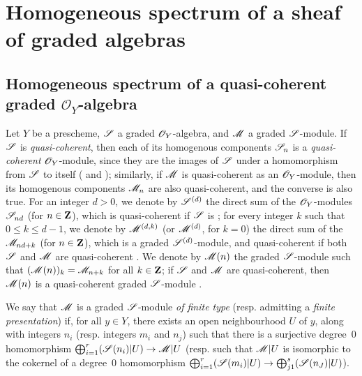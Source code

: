 \section{Homogeneous spectrum of a sheaf of graded algebras}
\label{section:II.3}


\subsection{Homogeneous spectrum of a quasi-coherent graded $\mathcal{O}_Y$-algebra}
\label{subsection:II.3.1}

\begin{env}[3.1.1]
\label{II.3.1.1}
Let $Y$ be a prescheme, $\mathscr{S}$ a graded $\mathscr{O}_Y$-algebra, and $\mathscr{M}$ a graded $\mathscr{S}$-module.
If $\mathscr{S}$ is \emph{quasi-coherent}, then each of its homogenous components $\mathscr{S}_n$ is a \emph{quasi-coherent} $\mathscr{O}_Y$-module, since they are the images of $\mathscr{S}$ under a homomorphism from $\mathscr{S}$ to itself ( and );
similarly, if $\mathscr{M}$ is quasi-coherent as an $\mathscr{O}_Y$-module, then its homogenous components $\mathscr{M}_n$ are also quasi-coherent, and the converse is also true.
For an integer $d>0$, we denote by $\mathscr{S}^{(d)}$ the direct sum of the $\mathscr{O}_Y$-modules $\mathscr{S}_{nd}$ (for $n\in\mathbf{Z}$), which is quasi-coherent if $\mathscr{S}$ is ;
for every integer $k$ such that $0\leq k\leq d-1$, we denote by $\mathscr{M}^{(d,k)}$ (or $\mathscr{M}^{(d)}$, for $k=0$) the direct sum of the $\mathscr{M}_{nd+k}$ (for $n\in\mathbf{Z}$), which is a graded $\mathscr{S}^{(d)}$-module, and quasi-coherent if both $\mathscr{S}$ and $\mathscr{M}$ are quasi-coherent .
We denote by $\mathscr{M}(n)$ the graded $\mathscr{S}$-module such that $(\mathscr{M}(n))_k=\mathscr{M}_{n+k}$ for all $k\in\mathbf{Z}$;
if $\mathscr{S}$ and $\mathscr{M}$ are quasi-coherent, then $\mathscr{M}(n)$ is a quasi-coherent graded $\mathscr{S}$-module .

We say that $\mathscr{M}$ is a graded $\mathscr{S}$-module \emph{of finite type} (resp. admitting a \emph{finite presentation})  if, for all $y\in Y$, there exists an open neighbourhood $U$ of $y$, along with integers $n_i$ (resp. integers $m_i$ and $n_j$) such that there is a surjective degree~$0$ homomorphism $\bigoplus_{i=1}^r(\sh{S}(n_i)|U)\to\sh{M}|U$ (resp. such that $\mathscr{M}|U$ is isomorphic to the cokernel of a degree~$0$ homomorphism $\bigoplus_{i=1}^r(\sh{S}(m_i)|U)\to\bigoplus_{j 1}^s(\sh{S}(n_J)|U)$).


\end{env}
